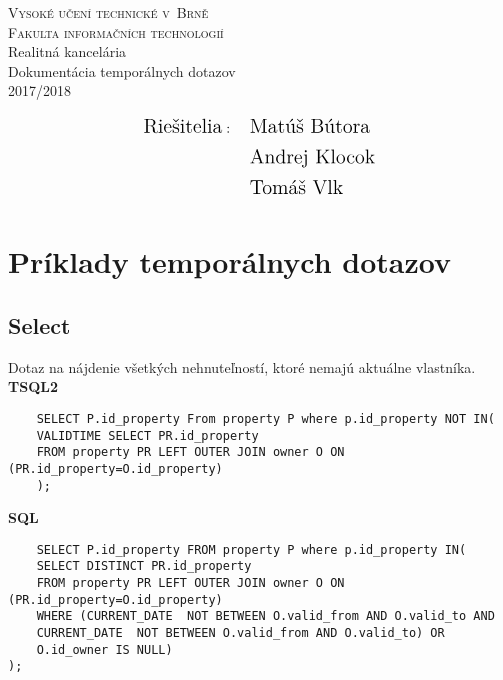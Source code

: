 \documentclass[11pt, a4paper]{article}
\begin{document}
\begin{center}
\textsc{\Huge{Vysoké učení technické v~Brně}\\
\Large{Fakulta informačních technologií}}\\
\Huge{Realitná kancelária}\\
\Large{Dokumentácia temporálnych dotazov}\\
\Large{2017/2018}
\end{center}


\begin{equation}
\begin{aligned}
\Large{\text{Riešitelia}:} \quad& \Large{\text{Matúš Bútora}}\\ \nonumber
& \Large{\text{Andrej Klocok}}\\
& \Large{\text{Tomáš Vlk}}
\end{aligned}
\end{equation}


\newpage
\pagestyle{plain}
\section{Príklady temporálnych dotazov}
\subsection{Select}
Dotaz na nájdenie všetkých nehnuteľností, ktoré nemajú aktuálne vlastníka.\\

\textbf{TSQL2}

\begin{center}
\begin{verbatim}
    SELECT P.id_property From property P where p.id_property NOT IN(
    VALIDTIME SELECT PR.id_property 
    FROM property PR LEFT OUTER JOIN owner O ON (PR.id_property=O.id_property)
    );
\end{verbatim}
\end{center}

\textbf{SQL}
\begin{center}
\begin{verbatim}
    SELECT P.id_property FROM property P where p.id_property IN(
    SELECT DISTINCT PR.id_property 
    FROM property PR LEFT OUTER JOIN owner O ON (PR.id_property=O.id_property) 
    WHERE (CURRENT_DATE  NOT BETWEEN O.valid_from AND O.valid_to AND
    CURRENT_DATE  NOT BETWEEN O.valid_from AND O.valid_to) OR 
    O.id_owner IS NULL)
);
\end{verbatim}
\end{center}
\end{document}
